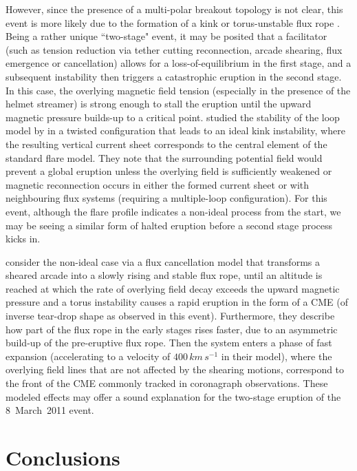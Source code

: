\documentclass[namedreferences]{solarphysics}
\begin{document}
\begin{article}
{However, since the presence of a multi-polar breakout topology is not clear, this event is more likely due to the formation of a kink or torus-unstable flux rope \cite{2004A&A...413L..27T,2010ApJ...708..314A}. Being a rather unique ``two-stage" event, it may be posited that a facilitator (such as tension reduction via tether cutting reconnection, arcade shearing, flux emergence or cancellation) allows for a loss-of-equilibrium in the first stage, and a subsequent instability then triggers a catastrophic eruption in the second stage. In this case, the overlying magnetic field tension (especially in the presence of the helmet streamer) is strong enough to stall the eruption until the upward magnetic pressure builds-up to a critical point.  studied the stability of the loop model by  in a twisted configuration that leads to an ideal kink instability, where the resulting vertical current sheet corresponds to the central element of the standard flare model. They note that the surrounding potential field would prevent a global eruption unless the overlying field is sufficiently weakened or magnetic reconnection occurs in either the formed current sheet or with neighbouring flux systems (requiring a multiple-loop configuration). For this event, although the flare profile indicates a non-ideal process from the start, we may be seeing a similar form of halted eruption before a second stage process kicks in.

 consider the non-ideal case via a flux cancellation model that transforms a sheared arcade into a slowly rising and stable flux rope, until an altitude is reached at which the rate of overlying field decay exceeds the upward magnetic pressure and a torus instability causes a rapid eruption in the form of a CME (of inverse tear-drop shape as observed in this event). Furthermore, they describe how part of the flux rope in the early stages rises faster, due to an asymmetric build-up of the pre-eruptive flux rope. Then the system enters a phase of fast expansion (accelerating to a velocity of $400\,km\,s^{-1}$ in their model), where the overlying field lines that are not affected by the shearing motions, correspond to the front of the CME commonly tracked in coronagraph observations. These modeled effects may offer a sound explanation for the two-stage eruption of the 8~March~2011 event. 


\section{Conclusions}
\label{sect:conclusions}

}
\end{article}
\end{document}

